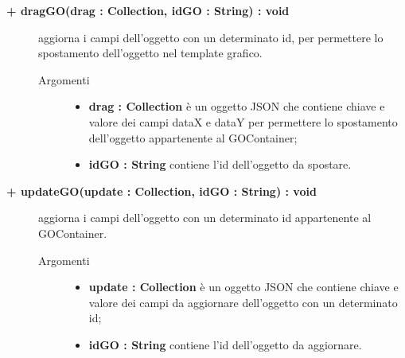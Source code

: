 \begin{description}
\begin{description}
\begin{description}
\end{description}

\end{description}

\begin{description}
		\item[\textbf{\color{blue}+ dragGO(drag : Collection, idGO : String) : void			}] \hfill
			aggiorna i campi dell'oggetto con un determinato id, per permettere lo spostamento dell'oggetto nel template grafico.    

\begin{description}
			\item[Argomenti] \hfill
				\begin{itemize}
					\item \textbf{drag : Collection			} \hfill
					è un oggetto JSON che contiene chiave e valore dei campi dataX e dataY per permettere lo spostamento dell'oggetto appartenente al GOContainer;
					\item \textbf{idGO : String			} \hfill
					contiene l'id dell'oggetto da spostare.
				\end{itemize}

\end{description}

\end{description}

\begin{description}
		\item[\textbf{\color{blue}+ updateGO(update : Collection, idGO : String) : void			}] \hfill
			aggiorna i campi dell'oggetto con un determinato id appartenente al GOContainer.  

\begin{description}
			\item[Argomenti] \hfill
				\begin{itemize}
						\item \textbf{update : Collection			} \hfill
					è un oggetto JSON che contiene chiave e valore dei campi da aggiornare dell'oggetto con un determinato id;
					\item \textbf{idGO : String			} \hfill
					contiene l'id dell'oggetto da aggiornare.
				\end{itemize}

\end{description}

\end{description}


\end{description}

